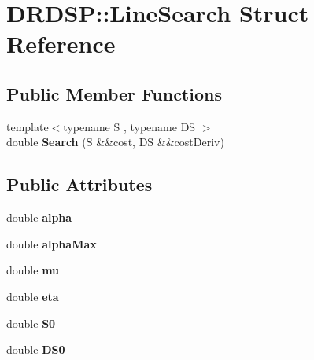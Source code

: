 \hypertarget{struct_d_r_d_s_p_1_1_line_search}{\section{D\-R\-D\-S\-P\-:\-:Line\-Search Struct Reference}
\label{struct_d_r_d_s_p_1_1_line_search}
}
\subsection*{Public Member Functions}
\begin{DoxyCompactItemize}
\item 
\hypertarget{struct_d_r_d_s_p_1_1_line_search_a6bcec01e58efcf7fe7306370de904717}{{\footnotesize template$<$typename S , typename D\-S $>$ }\\double {\bfseries Search} (S \&\&cost, D\-S \&\&cost\-Deriv)}\label{struct_d_r_d_s_p_1_1_line_search_a6bcec01e58efcf7fe7306370de904717}

\end{DoxyCompactItemize}
\subsection*{Public Attributes}
\begin{DoxyCompactItemize}
\item 
\hypertarget{struct_d_r_d_s_p_1_1_line_search_aa1b9be6dd476ea782296caf27fc87bcd}{double {\bfseries alpha}}\label{struct_d_r_d_s_p_1_1_line_search_aa1b9be6dd476ea782296caf27fc87bcd}

\item 
\hypertarget{struct_d_r_d_s_p_1_1_line_search_a79d6f5eaed56fd506b1d8a8f687d54a9}{double {\bfseries alpha\-Max}}\label{struct_d_r_d_s_p_1_1_line_search_a79d6f5eaed56fd506b1d8a8f687d54a9}

\item 
\hypertarget{struct_d_r_d_s_p_1_1_line_search_a48ee96d436216a66de45a13d700fcdaa}{double {\bfseries mu}}\label{struct_d_r_d_s_p_1_1_line_search_a48ee96d436216a66de45a13d700fcdaa}

\item 
\hypertarget{struct_d_r_d_s_p_1_1_line_search_ad1e2b29ad51dd189d3631fad059ec5d9}{double {\bfseries eta}}\label{struct_d_r_d_s_p_1_1_line_search_ad1e2b29ad51dd189d3631fad059ec5d9}

\item 
\hypertarget{struct_d_r_d_s_p_1_1_line_search_a3bb00fed00ecf84072fc6af165be2776}{double {\bfseries S0}}\label{struct_d_r_d_s_p_1_1_line_search_a3bb00fed00ecf84072fc6af165be2776}

\item 
\hypertarget{struct_d_r_d_s_p_1_1_line_search_ad76f45369c080f3d44f1daaf96114fe2}{double {\bfseries D\-S0}}\label{struct_d_r_d_s_p_1_1_line_search_ad76f45369c080f3d44f1daaf96114fe2}

\end{DoxyCompactItemize}
